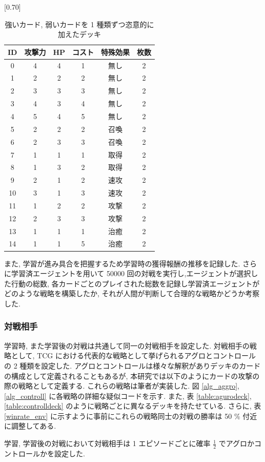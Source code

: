 \documentclass[12pt]{jarticle}
\begin{document}
\begin{table}[ht]
  \centering
  \caption{強いカード, 弱いカードを 1 種類ずつ恣意的に加えたデッキ}
  \label{table:OPdeck}
  \vspace{-0.3cm}
  \scalebox{0.70}[0.70]{
    \begin{tabular}{|c|c|c|c|c|c|}
      \hline
      ID & 攻撃力 & HP & コスト & 特殊効果 & 枚数 \\ \hline
      0 & 4 & 4 & 1 & 無し & 2 \\ \hline
      1 & 2 & 2 & 2 & 無し & 2 \\ \hline
      2 & 3 & 3 & 3 & 無し & 2 \\ \hline
      3 & 4 & 3 & 4 & 無し & 2 \\ \hline
      4 & 5 & 4 & 5 & 無し & 2 \\ \hline
      5 & 2 & 2 & 2 & 召喚 & 2 \\ \hline
      6 & 2 & 3 & 3 & 召喚 & 2 \\ \hline
      7 & 1 & 1 & 1 & 取得 & 2 \\ \hline
      8 & 1 & 3 & 2 & 取得 & 2 \\ \hline
      9 & 2 & 1 & 2 & 速攻 & 2 \\ \hline
      10 & 3 & 1 & 3 & 速攻 & 2 \\ \hline
      11 & 1 & 2 & 2 & 攻撃 & 2 \\ \hline
      12 & 2 & 3 & 3 & 攻撃 & 2 \\ \hline
      13 & 1 & 1 & 1 & 治癒 & 2 \\ \hline
      14 & 1 & 1 & 5 & 治癒 & 2 \\ \hline
      \end{tabular}
  }
  
  \end{table}
また, 学習が進み具合を把握するため学習時の獲得報酬の推移を記録した.
さらに学習済エージェントを用いて 50000 回の対戦を実行し,エージェントが選択した行動の総数, 各カードごとのプレイされた総数を記録し学習済エージェントがどのような戦略を構築したか, それが人間が判断して合理的な戦略かどうか考察した.

\subsubsection{対戦相手}
学習時, また学習後の対戦は共通して同一の対戦相手を設定した. 
対戦相手の戦略として, TCG における代表的な戦略として挙げられるアグロとコントロールの 2 種類を設定した. アグロとコントロールは様々な解釈がありデッキのカードの構成として定義されることもあるが, 本研究では以下のようにカードの攻撃の際の戦略として定義する. これらの戦略は筆者が実装した.  図 \ref{alg_aggro}, \ref{alg_controll} に各戦略の詳細な疑似コードを示す. また, 表 \ref{table:agurodeck}, \ref{table:controlldeck} のように戦略ごとに異なるデッキを持たせている. さらに, 表 \ref{winrate_env} に示すように事前にこれらの戦略同士の対戦の勝率は 50 \% 付近に調整してある. \par
学習, 学習後の対戦において対戦相手は 1 エピソードごとに確率 $\frac{1}{2}$ でアグロかコントロールかを設定した.
\end{document}
